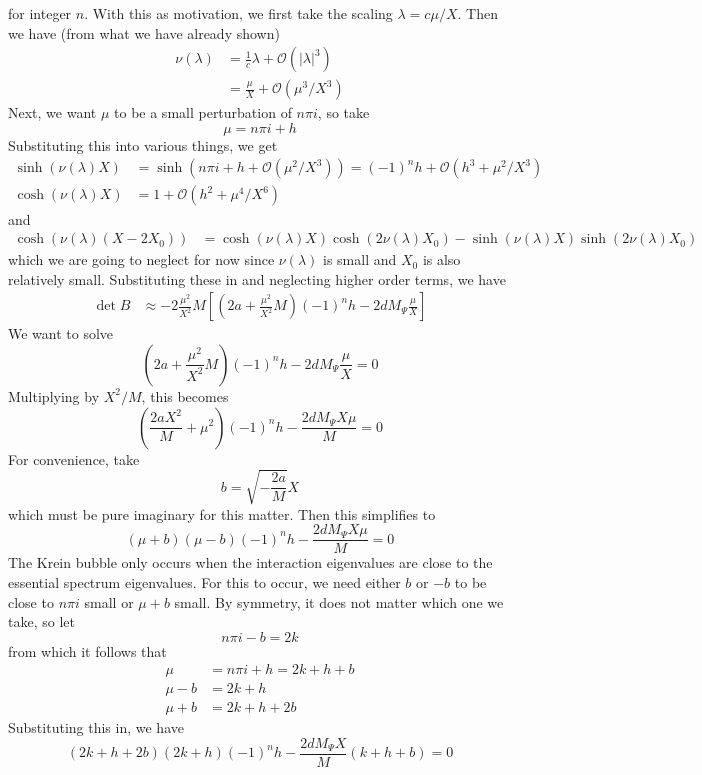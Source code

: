 \documentclass[thesis.tex]{subfiles}
\begin{document}
for integer $n$. With this as motivation, we first take the scaling $\lambda = c \mu / X$. Then we have (from what we have already shown)
\begin{align*}
\nu(\lambda) &= \frac{1}{c} \lambda + \mathcal{O}(|\lambda|^3) 
\\
&= \frac{\mu}{X} + \mathcal{O}(\mu^3 / X^3)
\end{align*}
Next, we want $\mu$ to be a small perturbation of $n \pi i$, so take 
\[
\mu = n \pi i + h
\]
Substituting this into various things, we get
\begin{align*}
\sinh(\nu(\lambda)X) &= \sinh(n \pi i + h + \mathcal{O}(\mu^2 / X^3)) = (-1)^n h + \mathcal{O}(h^3 + \mu^2 / X^3) \\
\cosh(\nu(\lambda)X) &= 1 + \mathcal{O}(h^2 + \mu^4 / X^6)
\end{align*}
and
\begin{align*}
\cosh( \nu(\lambda)(X - 2 X_0))
&= \cosh( \nu(\lambda)X) \cosh(2 \nu(\lambda)X_0) 
- \sinh( \nu(\lambda)X) \sinh(2 \nu(\lambda)X_0) 
\end{align*}
which we are going to neglect for now since $\nu(\lambda)$ is small and $X_0$ is also relatively small. Substituting these in and neglecting higher order terms, we have
\begin{align*}
\det B &\approx -2 \frac{\mu^2}{X^2} M \left[ \left(2a + \frac{\mu^2}{X^2} M\right)(-1)^n h - 2 d M_\Psi \frac{\mu}{X} \right] 
\end{align*}
We want to solve
\[
\left(2a + \frac{\mu^2}{X^2} M\right)(-1)^n h - 2 d M_\Psi \frac{\mu}{X} = 0
\]
Multiplying by $X^2/M$, this becomes
\[
\left(\frac{2aX^2}{M} + \mu^2 \right)(-1)^n h - \frac{2 d M_\Psi X \mu}{M} = 0
\]
For convenience, take
\[
b = \sqrt{-\frac{2a}{M}}X 
\]
which must be pure imaginary for this matter. Then this simplifies to
\[
(\mu + b)(\mu - b)(-1)^n h - \frac{2 d M_\Psi X \mu}{M} = 0
\]
The Krein bubble only occurs when the interaction eigenvalues are close to the essential spectrum eigenvalues. For this to occur, we need either $b$ or $-b$ to be close to $n \pi i$ small or $\mu + b$ small. By symmetry, it does not matter which one we take, so let
\[
n \pi i - b = 2 k
\]
from which it follows that
\begin{align*}
\mu &= n \pi i + h = 2 k + h + b \\
\mu - b &= 2 k + h \\
\mu + b &= 2 k + h + 2b
\end{align*}
Substituting this in, we have
\[
(2k + h + 2b)(2k + h)(-1)^n h - \frac{2 d M_\Psi X}{M}(k + h + b) = 0
\]
\end{document}
